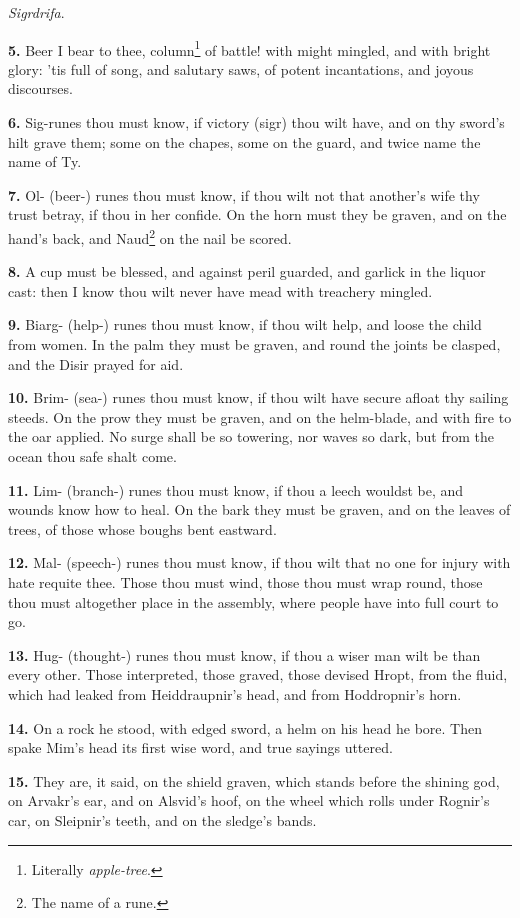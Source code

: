 \emph{Sigrdrifa}.

\textbf{5.} Beer I bear to thee, column\footnote{Literally \emph{apple-tree}.} of battle! with might mingled,
and with bright glory: 'tis full of song, and salutary saws, of potent
incantations, and joyous discourses.

\textbf{6.} Sig-runes thou must know, if victory (sigr) thou wilt have, and
on thy sword's hilt grave them; some on the chapes, some on the guard,
and twice name the name of Ty.

\textbf{7.} Ol- (beer-) runes thou must know, if thou wilt not that another's
wife thy trust betray, if thou in her confide. On the horn must they
be graven, and on the hand's back, and Naud\footnote{The name of a rune.} on the nail be scored.

\textbf{8.} A cup must be blessed, and against peril guarded, and garlick in
the liquor cast: then I know thou wilt never have mead with treachery
mingled.

\textbf{9.} Biarg- (help-) runes thou must know, if thou wilt help, and loose
the child from women. In the palm they must be graven, and round the
joints be clasped, and the Disir prayed for aid.

\textbf{10.} Brim- (sea-) runes thou must know, if thou wilt have secure
afloat thy sailing steeds. On the prow they must be graven, and on the
helm-blade, and with fire to the oar applied. No surge shall be so
towering, nor waves so dark, but from the ocean thou safe shalt come.

\textbf{11.} Lim- (branch-) runes thou must know, if thou a leech wouldst be,
and wounds know how to heal. On the bark they must be graven, and on
the leaves of trees, of those whose boughs bent eastward.

\textbf{12.} Mal- (speech-) runes thou must know, if thou wilt that no one
for injury with hate requite thee. Those thou must wind, those thou
must wrap round, those thou must altogether place in the assembly,
where people have into full court to go.

\textbf{13.} Hug- (thought-) runes thou must know, if thou a wiser man wilt
be than every other. Those interpreted, those graved, those devised
Hropt, from the fluid, which had leaked from Heiddraupnir's head, and
from Hoddropnir's horn.

\textbf{14.} On a rock he stood, with edged sword, a helm on his head he
bore. Then spake Mim's head its first wise word, and true sayings
uttered.

\textbf{15.} They are, it said, on the shield graven, which stands before the
shining god, on Arvakr's ear, and on Alsvid's hoof, on the wheel which
rolls under Rognir's car, on Sleipnir's teeth, and on the sledge's
bands.

